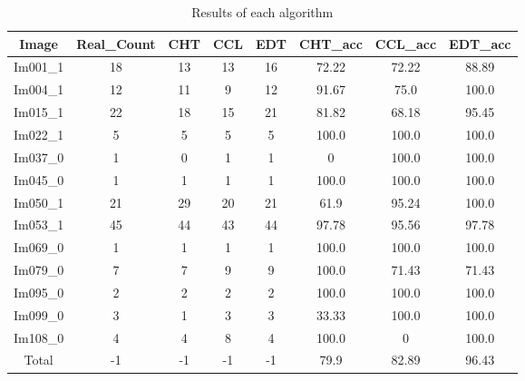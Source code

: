 \begin{table}[H]
\centering
\begin{tabular}{|c|c|c|c|c|c|c|c|}
\hline
 \textbf{Image} & \textbf{Real\_Count} & \textbf{CHT} & \textbf{CCL} & \textbf{EDT} & \textbf{CHT\_acc} & \textbf{CCL\_acc} & \textbf{EDT\_acc} \\ \hline
 Im001\_1 & 18 & 13 & 13 & 16 & 72.22 & 72.22 & 88.89 \\ 
 Im004\_1 & 12 & 11 & 9 & 12 & 91.67 & 75.0 & 100.0 \\ 
 Im015\_1 & 22 & 18 & 15 & 21 & 81.82 & 68.18 & 95.45 \\ 
 Im022\_1 & 5 & 5 & 5 & 5 & 100.0 & 100.0 & 100.0 \\ 
 Im037\_0 & 1 & 0 & 1 & 1 & 0 & 100.0 & 100.0 \\ 
 Im045\_0 & 1 & 1 & 1 & 1 & 100.0 & 100.0 & 100.0 \\ 
 Im050\_1 & 21 & 29 & 20 & 21 & 61.9 & 95.24 & 100.0 \\ 
 Im053\_1 & 45 & 44 & 43 & 44 & 97.78 & 95.56 & 97.78 \\ 
 Im069\_0 & 1 & 1 & 1 & 1 & 100.0 & 100.0 & 100.0 \\ 
 Im079\_0 & 7 & 7 & 9 & 9 & 100.0 & 71.43 & 71.43 \\ 
 Im095\_0 & 2 & 2 & 2 & 2 & 100.0 & 100.0 & 100.0 \\ 
 Im099\_0 & 3 & 1 & 3 & 3 & 33.33 & 100.0 & 100.0 \\ 
 Im108\_0 & 4 & 4 & 8 & 4 & 100.0 & 0 & 100.0 \\ \hline
 Total & -1 & -1 & -1 & -1 & 79.9 & 82.89 & 96.43 \\ 

\hline
\end{tabular}
\caption{Results of each algorithm}
\label{Results of each algorithm}
\end{table}
